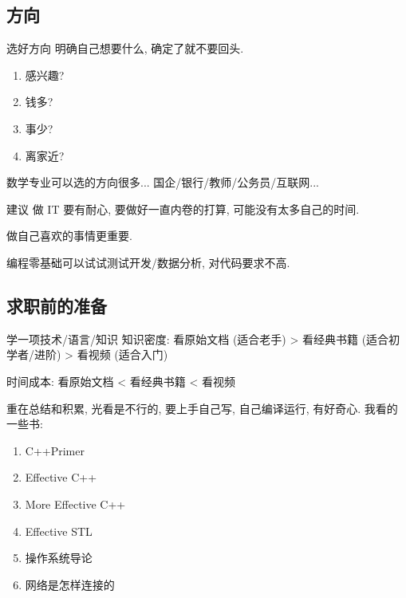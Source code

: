 \documentclass{ctexbeamer}
\begin{document}
\subsection{方向}
\begin{frame}{选好方向}
	明确自己想要什么, 确定了就不要回头.
	\begin{enumerate}
		\item 感兴趣?
		\item 钱多?
		\item 事少?
		\item 离家近?
	\end{enumerate}

	数学专业可以选的方向很多... 国企/银行/教师/公务员/互联网...

	\begin{exampleblock}{建议}
		做 IT 要有耐心, 要做好一直内卷的打算, 
		可能没有太多自己的时间. 

		做自己喜欢的事情更重要. 

		编程零基础可以试试测试开发/数据分析, 对代码要求不高. 
	\end{exampleblock}
\end{frame}



\subsection{求职前的准备}
\begin{frame}
	\begin{alertblock}{学一项技术/语言/知识}
		知识密度: 看原始文档 (适合老手) > 看经典书籍 (适合初学者/进阶) > 看视频 (适合入门)

		时间成本: 看原始文档 < 看经典书籍 < 看视频
	\end{alertblock}
	重在总结和积累, 光看是不行的, 要上手自己写, 自己编译运行, 有好奇心. 
	我看的一些书:
	\begin{enumerate}
		\item C++Primer
		\item Effective C++
		\item More Effective C++
		\item Effective STL
		\item 操作系统导论
		\item 网络是怎样连接的
	\end{enumerate}
\end{frame}
\end{document}
